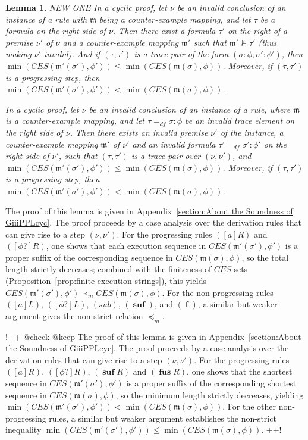 \documentclass[manuscript,screen]{acmart}
\newtheorem{lemma}{Lemma}[section]
\newcommand{\mfr}[1]{\mathfrak{#1}}
\newcommand{\dddef}[0]{=_{df}}
\newcommand{\mult}[0]{\preceq_m}
\newcommand{\pmult}[0]{\prec_m}
\newcommand{\Sub}[0]{{\textit{sub}}}
\newcommand{\lm}[0]{\mfr{m}}
\newcommand{\EX}[0]{\textit{CES}}
\DeclareMathOperator{\ofst}{\mathbf{f}}
\DeclareMathOperator{\osuf}{\mathbf{suf}}
\DeclareMathOperator{\ofus}{\mathbf{fus}}
\begin{document}
\begin{lemma}
    \label{lemma:infinite descent sequence}
    \ifx NEW ONE
    In a cyclic proof, 
    let $\nu$ be an invalid conclusion of an instance of a rule with $\lm$ being a counter-example mapping, and let $\tau$ be a formula on the right side of $\nu$. 
    Then there exist a formula $\tau'$ on the right of a premise $\nu'$ of $\nu$ and a counter-example mapping $\lm'$ such that $\lm'\not\models \tau'$ (thus making $\nu'$ invalid). 
    And if $(\tau, \tau')$ is a trace pair of the form $(\sigma : \phi, \sigma' : \phi')$, then $\min(\EX(\lm'(\sigma'), \phi')) \le \min(\EX(\lm(\sigma), \phi))$. 
    Moreover, if $(\tau, \tau')$ is a progressing step, then $\min(\EX(\lm'(\sigma'), \phi')) < \min(\EX(\lm(\sigma), \phi))$. 
    \fi

    
    In a cyclic proof, 
let $\nu$ be an invalid conclusion of an instance of a rule, where $\lm$ is a counter-example mapping, and let $\tau\dddef \sigma : \phi$ be an invalid trace element on the right side of $\nu$. 
    Then there exists an invalid premise $\nu'$ of the instance, a counter-example mapping $\lm'$ of $\nu'$ and an invalid formula $\tau'\dddef \sigma' : \phi'$ on the right side of $\nu'$, such that 
    $(\tau, \tau')$ is a trace pair over $(\nu, \nu')$, and
    $\min(\EX(\lm'(\sigma'), \phi')) \le \min(\EX(\lm(\sigma), \phi))$. 
    Moreover, if $(\tau, \tau')$ is a progressing step, then $\min(\EX(\lm'(\sigma'), \phi')) < \min(\EX(\lm(\sigma), \phi))$. 
    
\end{lemma}

\ifx
The proof of this lemma is given in Appendix~\ref{section:About the Soundness of GiiiPPLcyc}. 
The proof proceeds by a case analysis over the derivation rules that can give rise to a step $(\nu, \nu')$.  For the progressing rules $([a]R)$ and $([\phi?]R)$, one shows that each execution sequence in $\EX(\lm'(\sigma'), \phi')$ is a proper suffix of the corresponding sequence in $\EX(\lm(\sigma), \phi)$, so the total length strictly decreases; combined with the finiteness of $\EX$ sets (Proposition~\ref{prop:finite execution strings}), this yields $\EX(\lm'(\sigma'), \phi')\pmult \EX(\lm(\sigma), \phi)$.  For the non-progressing rules $([a]L)$, $([\phi?]L)$, $(\Sub)$, $(\osuf)$, and $(\ofst)$, a similar but weaker argument gives the non-strict relation $\mult$.
\fi

\ifx
!++ @check @keep
The proof of this lemma is given in Appendix~\ref{section:About the Soundness of GiiiPPLcyc}.
The proof proceeds by a case analysis over the derivation rules that can give rise to a step $(\nu, \nu')$.  For the progressing rules $([a]R)$, $([\phi?]R)$, $(\osuf R)$ and $(\ofus R)$, one shows that the shortest sequence in $\EX(\lm'(\sigma'), \phi')$ is a proper suffix of the corresponding shortest sequence in $\EX(\lm(\sigma), \phi)$, so the minimum length strictly decreases, yielding $\min(\EX(\lm'(\sigma'), \phi')) < \min(\EX(\lm(\sigma), \phi))$.  For the other non-progressing rules, a similar but weaker argument establishes the non-strict inequality $\min(\EX(\lm'(\sigma'), \phi')) \le \min(\EX(\lm(\sigma), \phi))$. 
++!
\fi
\end{document}
